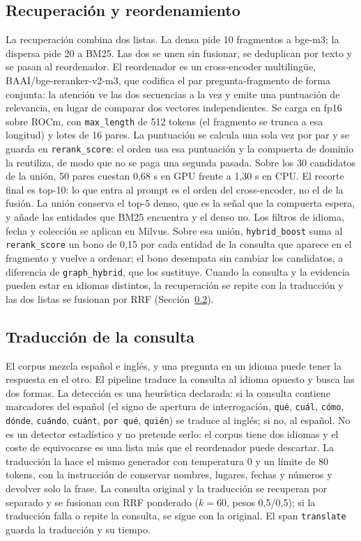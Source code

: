 \subsection{Recuperaci\'on y reordenamiento}
\label{sec:recuperacion}

La recuperaci\'on combina dos listas. La densa pide 10 fragmentos a bge-m3; la dispersa pide 20 a BM25. Las dos se unen sin fusionar, se deduplican por texto y se pasan al reordenador. El reordenador es un cross-encoder multiling\"ue, BAAI/bge-reranker-v2-m3, que codifica el par pregunta-fragmento de forma conjunta: la atenci\'on ve las dos secuencias a la vez y emite una puntuaci\'on de relevancia, en lugar de comparar dos vectores independientes. Se carga en fp16 sobre ROCm, con \texttt{max\_length} de 512 tokens (el fragmento se trunca a esa longitud) y lotes de 16 pares. La puntuaci\'on se calcula una sola vez por par y se guarda en \texttt{rerank\_score}: el orden usa esa puntuaci\'on y la compuerta de dominio la reutiliza, de modo que no se paga una segunda pasada. Sobre los 30 candidatos de la uni\'on, 50 pares cuestan 0,68 s en GPU frente a 1,30 s en CPU. El recorte final es top-10: lo que entra al prompt es el orden del cross-encoder, no el de la fusi\'on. La uni\'on conserva el top-5 denso, que es la se\~nal que la compuerta espera, y a\~nade las entidades que BM25 encuentra y el denso no. Los filtros de idioma, fecha y colecci\'on se aplican en Milvus. Sobre esa uni\'on, \texttt{hybrid\_boost} suma al \texttt{rerank\_score} un bono de 0,15 por cada entidad de la consulta que aparece en el fragmento y vuelve a ordenar; el bono desempata sin cambiar los candidatos, a diferencia de \texttt{graph\_hybrid}, que los sustituye. Cuando la consulta y la evidencia pueden estar en idiomas distintos, la recuperaci\'on se repite con la traducci\'on y las dos listas se fusionan por RRF (Secci\'on~\ref{sec:traduccion}).

\subsection{Traducci\'on de la consulta}
\label{sec:traduccion}

El corpus mezcla espa\~nol e ingl\'es, y una pregunta en un idioma puede tener la respuesta en el otro. El pipeline traduce la consulta al idioma opuesto y busca las dos formas. La detecci\'on es una heur\'istica declarada: si la consulta contiene marcadores del espa\~nol (el signo de apertura de interrogaci\'on, \texttt{qu\'e}, \texttt{cu\'al}, \texttt{c\'omo}, \texttt{d\'onde}, \texttt{cu\'ando}, \texttt{cu\'ant}, \texttt{por qu\'e}, \texttt{qui\'en}) se traduce al ingl\'es; si no, al espa\~nol. No es un detector estad\'istico y no pretende serlo: el corpus tiene dos idiomas y el coste de equivocarse es una lista m\'as que el reordenador puede descartar. La traducci\'on la hace el mismo generador con temperatura 0 y un l\'imite de 80 tokens, con la instrucci\'on de conservar nombres, lugares, fechas y n\'umeros y devolver solo la frase. La consulta original y la traducci\'on se recuperan por separado y se fusionan con RRF ponderado ($k=60$, pesos 0,5/0,5); si la traducci\'on falla o repite la consulta, se sigue con la original. El span \texttt{translate} guarda la traducci\'on y su tiempo.


